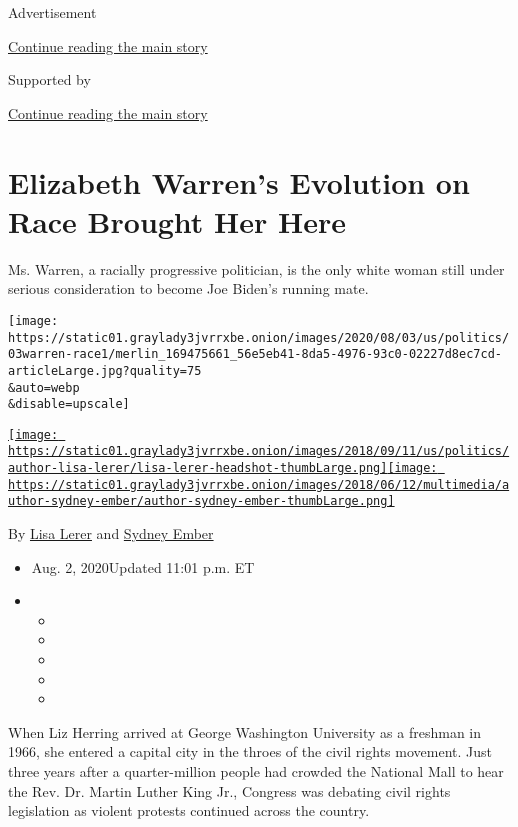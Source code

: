 Advertisement

\protect\hyperlink{after-top}{Continue reading the main story}

Supported by

\protect\hyperlink{after-sponsor}{Continue reading the main story}

\hypertarget{elizabeth-warrens-evolution-on-race-brought-her-here}{%
\section{Elizabeth Warren's Evolution on Race Brought Her
Here}\label{elizabeth-warrens-evolution-on-race-brought-her-here}}

Ms. Warren, a racially progressive politician, is the only white woman
still under serious consideration to become Joe Biden's running mate.

\texttt{[image: https://static01.graylady3jvrrxbe.onion/images/2020/08/03/us/politics/03warren-race1/merlin\_169475661\_56e5eb41-8da5-4976-93c0-02227d8ec7cd-articleLarge.jpg?quality=75\\\&auto=webp\\\&disable=upscale]}

\href{https://www.nytimes3xbfgragh.onion/by/lisa-lerer}{\texttt{[image: https://static01.graylady3jvrrxbe.onion/images/2018/09/11/us/politics/author-lisa-lerer/lisa-lerer-headshot-thumbLarge.png]}}\href{https://www.nytimes3xbfgragh.onion/by/sydney-ember}{\texttt{[image: https://static01.graylady3jvrrxbe.onion/images/2018/06/12/multimedia/author-sydney-ember/author-sydney-ember-thumbLarge.png]}}

By \href{https://www.nytimes3xbfgragh.onion/by/lisa-lerer}{Lisa Lerer}
and \href{https://www.nytimes3xbfgragh.onion/by/sydney-ember}{Sydney
Ember}

\begin{itemize}
\item
  Aug. 2, 2020Updated 11:01 p.m. ET
\item
  \begin{itemize}
  \item
  \item
  \item
  \item
  \item
  \end{itemize}
\end{itemize}

When Liz Herring arrived at George Washington University as a freshman
in 1966, she entered a capital city in the throes of the civil rights
movement. Just three years after a quarter-million people had crowded
the National Mall to hear the Rev. Dr. Martin Luther King Jr., Congress
was debating civil rights legislation as violent protests continued
across the country.

